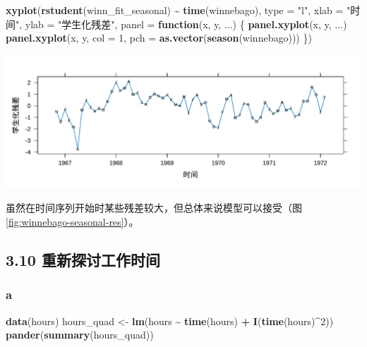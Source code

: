\documentclass[
]{article}
\newenvironment{Shaded}{\begin{snugshade}}{\end{snugshade}}
\newcommand{\AttributeTok}[1]{\textcolor[rgb]{0.13,0.29,0.53}{#1}}
\newcommand{\ControlFlowTok}[1]{\textcolor[rgb]{0.13,0.29,0.53}{\textbf{#1}}}
\newcommand{\DecValTok}[1]{\textcolor[rgb]{0.00,0.00,0.81}{#1}}
\newcommand{\FunctionTok}[1]{\textcolor[rgb]{0.13,0.29,0.53}{\textbf{#1}}}
\newcommand{\NormalTok}[1]{#1}
\newcommand{\OtherTok}[1]{\textcolor[rgb]{0.56,0.35,0.01}{#1}}
\newcommand{\SpecialCharTok}[1]{\textcolor[rgb]{0.81,0.36,0.00}{\textbf{#1}}}
\newcommand{\StringTok}[1]{\textcolor[rgb]{0.31,0.60,0.02}{#1}}
\begin{document}
\begin{Shaded}
\begin{Highlighting}[]
\FunctionTok{xyplot}\NormalTok{(}\FunctionTok{rstudent}\NormalTok{(winn\_fit\_seasonal) }\SpecialCharTok{\textasciitilde{}} \FunctionTok{time}\NormalTok{(winnebago), }\AttributeTok{type =} \StringTok{"l"}\NormalTok{,}
       \AttributeTok{xlab =} \StringTok{"时间"}\NormalTok{, }\AttributeTok{ylab =} \StringTok{"学生化残差"}\NormalTok{,}
       \AttributeTok{panel =} \ControlFlowTok{function}\NormalTok{(x, y, ...) \{}
         \FunctionTok{panel.xyplot}\NormalTok{(x, y, ...)}
         \FunctionTok{panel.xyplot}\NormalTok{(x, y, }\AttributeTok{col =} \DecValTok{1}\NormalTok{, }\AttributeTok{pch =} \FunctionTok{as.vector}\NormalTok{(}\FunctionTok{season}\NormalTok{(winnebago)))}
\NormalTok{       \})}
\end{Highlighting}
\end{Shaded}

\includegraphics{chapter3_files/figure-latex/winnebago-seasonal-res-1.pdf}

虽然在时间序列开始时某些残差较大，但总体来说模型可以接受（图\ref{fig:winnebago-seasonal-res}）。

\hypertarget{ux91cdux65b0ux63a2ux8ba8ux5de5ux4f5cux65f6ux95f4}{%
\subsection{3.10 重新探讨工作时间}\label{ux91cdux65b0ux63a2ux8ba8ux5de5ux4f5cux65f6ux95f4}}

\hypertarget{a-4}{%
\subsubsection*{a}\label{a-4}}

\begin{Shaded}
\begin{Highlighting}[]
\FunctionTok{data}\NormalTok{(hours)}
\NormalTok{hours\_quad }\OtherTok{\textless{}{-}} \FunctionTok{lm}\NormalTok{(hours }\SpecialCharTok{\textasciitilde{}} \FunctionTok{time}\NormalTok{(hours) }\SpecialCharTok{+} \FunctionTok{I}\NormalTok{(}\FunctionTok{time}\NormalTok{(hours)}\SpecialCharTok{\^{}}\DecValTok{2}\NormalTok{))}
\FunctionTok{pander}\NormalTok{(}\FunctionTok{summary}\NormalTok{(hours\_quad))}
\end{Highlighting}
\end{Shaded}
\end{document}
